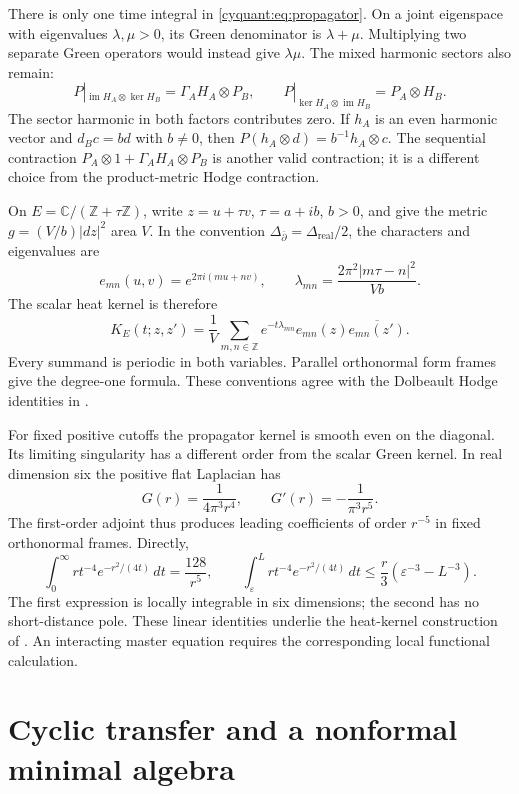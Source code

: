 There is only one time integral in \eqref{cyquant:eq:propagator}.
On a joint eigenspace with eigenvalues $\lambda,\mu>0$, its Green
denominator is $\lambda+\mu$.  Multiplying two separate Green operators
would instead give $\lambda\mu$.  The mixed harmonic sectors also
remain:
\[
 P|_{\operatorname{im}H_A\otimes\ker H_B}=\Gamma_AH_A\otimes P_B,
 \qquad P|_{\ker H_A\otimes\operatorname{im}H_B}=P_A\otimes H_B.
\]
The sector harmonic in both factors contributes zero.  If $h_A$ is an even
harmonic vector and $d_Bc=bd$ with $b\ne0$, then
$P(h_A\otimes d)=b^{-1}h_A\otimes c$.
The sequential contraction
$P_A\otimes1+\Gamma_AH_A\otimes P_B$ is another valid contraction;
it is a different choice from the product-metric Hodge contraction.

On $E=\mathbb C/(\mathbb Z+\tau\mathbb Z)$, write
$z=u+\tau v$, $\tau=a+ib$, $b>0$, and give the metric
$g=(V/b)|dz|^2$ area $V$.  In the convention
$\Delta_{\bar\partial}=\Delta_{\mathrm{real}}/2$, the characters and
eigenvalues are
\[
 e_{mn}(u,v)=e^{2\pi i(mu+nv)},\qquad
 \lambda_{mn}=\frac{2\pi^2|m\tau-n|^2}{Vb}.
\]
The scalar heat kernel is therefore
\begin{equation}\label{cyquant:eq:elliptic-heat}
 K_E(t;z,z')=\frac1V\sum_{m,n\in\mathbb Z}
       e^{-t\lambda_{mn}}e_{mn}(z)\overline{e_{mn}(z')}.
\end{equation}
Every summand is periodic in both variables.  Parallel orthonormal form
frames give the degree-one formula.  These conventions agree with the
Dolbeault Hodge identities in \cite[Ch.~VI, \S5]{cyquant:Demailly}.

For fixed positive cutoffs the propagator kernel is smooth even on the
diagonal.  Its limiting singularity has a different order from the scalar
Green kernel.  In real dimension six the positive flat Laplacian has
\[
 G(r)=\frac1{4\pi^3r^4},\qquad G'(r)=-\frac1{\pi^3r^5}.
\]
The first-order adjoint thus produces leading coefficients of order
$r^{-5}$ in fixed orthonormal frames.  Directly,
\[
 \int_0^\infty r t^{-4}e^{-r^2/(4t)}\,dt=\frac{128}{r^5},
 \qquad
 \int_\varepsilon^L r t^{-4}e^{-r^2/(4t)}\,dt
 \leq\frac r3(\varepsilon^{-3}-L^{-3}).
\]
The first expression is locally integrable in six dimensions; the second
has no short-distance pole.  These linear identities underlie the
heat-kernel construction of \cite[\S\S7.2.3--7.2.5]{CG2}.  An interacting
master equation requires the corresponding local functional calculation.

\section{Cyclic transfer and a nonformal minimal algebra}
\label{cyquant:sec:cyclic}

